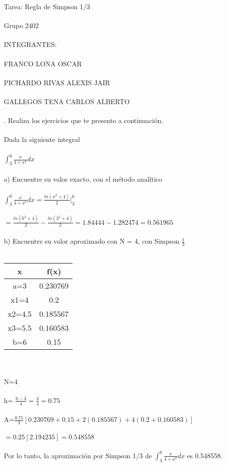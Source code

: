 \documentclass[a4paper,10pt]{article}
\title{}
\author{}
\date{}
\begin{document}
\maketitle
Tarea: Regla de Simpson 1/3\\\\

Grupo 2402\\\\
INTEGRANTES:\\\\
FRANCO LONA OSCAR\\\\
PICHARDO RIVAS ALEXIS JAIR\\\\
GALLEGOS TENA CARLOS ALBERTO\\\\
. Realiza los ejercicios que te presento a continuación.\\\\  

Dada la siguiente integral\\\\
$\int_{3}^{6} \frac{x}{4+x^2} dx$\\\\
a) Encuentre su valor exacto, con el método analítico\\\\
$\int_{3}^{6} \frac{x}{4+x^2} dx = \frac{ln(x^2 + 4)}{2} |_{3}^{6}$\\\\
$=\frac{ln(6^2 + 4)}{2} - \frac{ln(3^2 + 4)}{2} = 1.84444 - 1.282474 = 0.561965$\\\\
b) Encuentre su valor aproximado con N = 4, con Simpson $\frac{1}{3}$\\\\
\begin{tabular}{| c | c |}
\hline
x & f(x)\\
\hline
a=3 & 0.230769\\
x1=4 & 0.2\\
x2=4.5 & 0.185567\\
x3=5.5 & 0.160583\\
b=6 & 0.15\\
\hline
\end{tabular}\\\\
N=4\\\\
h= $\frac{6-3}{4} = \frac{3}{4} = 0.75$\\\\
A=$\frac{0.75}{3}[0.230769 + 0.15 + 2(0.185567) + 4(0.2+0.160583)]$\\\\
$= 0.25[2.194235] = 0.548558$\\\\
Por lo tanto, la aproximación por Simpson 1/3 de $\int_{3}^{6} \frac{x}{4+x^2} dx$ es 0.548558.\\\\
\end{document}
